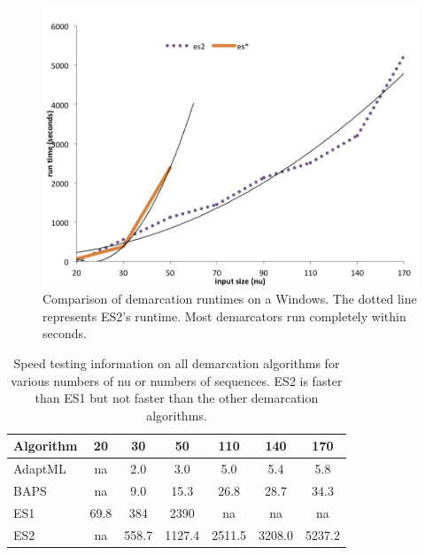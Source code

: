 \begin{figure}[h!]
  \centering
    \includegraphics[scale=0.7]{images/SpeedWindows-CH4}
      \caption[Demarcation run time test on Windows.]{Comparison of demarcation runtimes on a Windows. The dotted line represents ES2's runtime. Most demarcators run completely within seconds.}
    \label{fig:WindowsSpeed}
\end{figure}

\begin{table}
\centering
    \begin{tabular}{l|cccccc}
    Algorithm & 20   & 30    & 50     & 110    & 140    & 170    \\ \hline
    AdaptML   & na   & 2.0   & 3.0    & 5.0    & 5.4    & 5.8    \\
    BAPS      & na   & 9.0   & 15.3   & 26.8   & 28.7   & 34.3   \\
    ES1       & 69.8 & 384   & 2390   & na     & na     & na     \\
    ES2       & na   & 558.7 & 1127.4 & 2511.5 & 3208.0 & 5237.2 \\
    \end{tabular}
    \caption[Speed testing information on all demarcation algorithms.]{Speed testing information on all demarcation algorithms for various numbers of nu or numbers of sequences. ES2 is faster than ES1 but not faster than the other demarcation algorithms.}
    \label{tab:WindowsSpeed}
\end{table}

